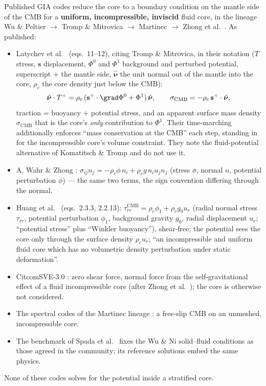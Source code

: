 \documentclass[11pt]{article}
\numberwithin{equation}{section}
\theoremstyle{remark}
\newcommand{\vs}{\mathbf{s}}
\begin{document}
Published GIA codes reduce the core to a boundary condition on the mantle
side of the CMB for a \textbf{uniform, incompressible, inviscid} fluid
core, in the lineage Wu \& Peltier \cite{WuPeltier1982} $\to$ Tromp \&
Mitrovica \cite{TrompMitrovica1999} $\to$ Martinec \cite{Martinec2000}
$\to$ Zhong et al.\ \cite{Zhong2003}. As published:
\begin{itemize}
\item Latychev et al.\ \cite{Latychev2005} (eqs.~11--12), citing Tromp \&
  Mitrovica, in their notation ($T$ stress, $\vs$ displacement, $\Phi^0$
  and $\Phi^1$ background and perturbed potential, superscript $+$ the
  mantle side, $\hat{\bm{\nu}}$ the unit normal out of the mantle into the
  core, $\rho_c$ the core density just below the CMB):
  \begin{equation}
    \hat{\bm{\nu}}\cdot T^+ = \rho_c\,(\vs^+\cdot\grad\Phi^0 + \Phi^1)\,
      \hat{\bm{\nu}}, \qquad
    \sigma_{\mathrm{CMB}} = -\rho_c\,\vs^+\cdot\hat{\bm{\nu}},
  \end{equation}
  traction = buoyancy + potential stress, and an apparent surface mass
  density $\sigma_{\mathrm{CMB}}$ that is the core's \emph{only}
  contribution to $\Phi^1$. Their time-marching additionally enforces
  ``mass conservation at the CMB'' each step, standing in for the
  incompressible core's volume constraint. They note the fluid-potential
  alternative of Komatitsch \& Tromp \cite{KomatitschTromp2002} and do
  not use it.
\item A, Wahr \& Zhong \cite{AWahrZhong2013}: $\sigma_{ij}n_j = -\rho_c\phi\,
  n_i + \rho_c g\,n_i u_jn_j$ (stress $\sigma$, normal $n$, potential
  perturbation $\phi$) --- the same two terms, the sign convention
  differing through the normal.
\item Huang et al.\ \cite{Huang2023} (eqs.~2.3.3, 2.2.13):
  $\tau^{\mathrm{CMB}}_{rr} = \rho_c\phi_1 + \rho_c g_0 u_r$ (radial normal
  stress $\tau_{rr}$, potential perturbation $\phi_1$, background gravity
  $g_0$, radial displacement $u_r$; ``potential stress'' plus ``Winkler
  buoyancy''), shear-free; the potential sees the core only through the
  surface density $\rho_c u_r$; ``an incompressible and uniform fluid core
  which has no volumetric density perturbation under static
  deformation''.
\item CitcomSVE-3.0 \cite{CitcomSVE2025}: zero shear force, normal force
  from the self-gravitational effect of a fluid incompressible core
  (after Zhong et al.\ \cite{Zhong2003}); the core is otherwise not
  considered.
\item The spectral codes of the Martinec lineage \cite{Martinec1999,
  Martinec2000}: a free-slip CMB on an unmeshed, incompressible core.
\item The benchmark of Spada et al.\ \cite{Spada2011} fixes the Wu \& Ni
  \cite{WuNi1996} solid--fluid conditions as those agreed in the
  community; its reference solutions embed the same physics.
\end{itemize}
None of these codes solves for the potential inside a stratified core.
\end{document}
